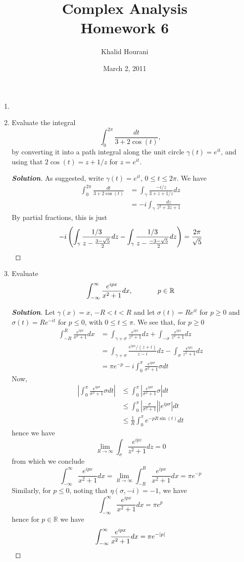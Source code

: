 \documentclass[12pt,leqno]{article}
\title{Complex Analysis\\\large Homework 6}
\date{March 2, 2011}
\author{Khalid Hourani}
\theoremstyle{definition}
\newcommand{\R}{\mathbb{R}}
\newenvironment{Solution}{\begin{proof}[\textnormal{\textbf{Solution}}]}{\end{proof}}
\begin{document}
 \begin{titlepage}
  \maketitle
 \end{titlepage}
\clearpage\mbox{}\clearpage

\setcounter{page}{1}
\begin{enumerate}
 \item 
 \item Evaluate the integral \[\int_0^{2\pi}\frac{dt}{3+2\cos(t)},\] by converting it into a path integral along the unit circle $\gamma(t)=e^{it}$, and using that $2\cos(t)=z+1/z$ for $z=e^{it}$.
  \begin{Solution}
   As suggested, write $\gamma(t)=e^{it}$, $0\leq t\leq2\pi$. We have \begin{align*}\int_0^{2\pi}\frac{dt}{3+2\cos(t)}&=\int_{\gamma}\frac{-i/z}{3+z+1/z}dz\\&=-i\int_{\gamma}\frac{dz}{z^2+3z+1}\end{align*} By partial fractions, this is just \[-i\left(\int_{\gamma}\frac{1/3}{z-\frac{3-\sqrt{5}}{2}}dz-\int_{\gamma}\frac{1/3}{z-\frac{-3-\sqrt{5}}{2}}dz\right)=\frac{2\pi}{\sqrt{5}}\qedhere\]
  \end{Solution}
 \item Evaluate \[\int_{-\infty}^{\infty}\frac{e^{ipx}}{x^2+1}dx,\hskip.5inp\in\R\]
  \begin{Solution}
   Let $\gamma(x)=x$, $-R<t<R$ and let $\sigma(t)=Re^{it}$ for $p\geq0$ and $\sigma(t)=Re^{-it}$ for $p\leq0$, with $0\leq t\leq\pi$. We see that, for $p\geq0$ \begin{align*}\int_{-R}^R\frac{e^{ipx}}{x^2+1}dx&=\int_{\gamma+\sigma}\frac{e^{ipz}}{z^2+1}dz+\int_{-\sigma}\frac{e^{ipz}}{z^2+1}dz\\&=\int_{\gamma+\sigma}\frac{e^{ipz}/(z+i)}{z-i}dz-\int_{\sigma}\frac{e^{ipz}}{z^2+1}dz\\&=\pi e^{-p}-i\int_0^{\pi}\frac{e^{ip\sigma}}{\sigma^2+1}\sigma dt\end{align*} Now, \begin{align*}\left|\int_{0}^{\pi}\frac{e^{ip\sigma}}{\sigma^2+1}\sigma dt\right|&\leq\int_0^{\pi}\left|\frac{e^{ip\sigma}}{\sigma^2+1}\sigma\right| dt\\&\leq\int_0^{\pi}\left|\frac{\sigma}{\sigma^2+1}\right|\left|e^{ip\sigma}\right|dt\\&\leq\frac{1}{R}\int_0^{\pi}e^{-pR\sin(t)}dt\end{align*} hence we have \[\lim_{R\to\infty}\int_{\sigma}\frac{e^{ipz}}{z^2+1}dz=0\] from which we conclude \[\int_{-\infty}^{\infty}\frac{e^{ipx}}{x^2+1}dx=\lim_{R\to\infty}\int_{-R}^R\frac{e^{ipx}}{x^2+1}dx=\pi e^{-p}\] Similarly, for $p\leq0$, noting that $\eta(\sigma,-i)=-1$, we have \[\int_{-\infty}^{\infty}\frac{e^{ipx}}{x^2+1}dx=\pi e^p\] hence for $p\in\R$ we have \[\int_{-\infty}^{\infty}\frac{e^{ipx}}{x^2+1}dx=\pi e^{-|p|}\qedhere\]

\end{Solution}
\end{enumerate}
\end{document}
